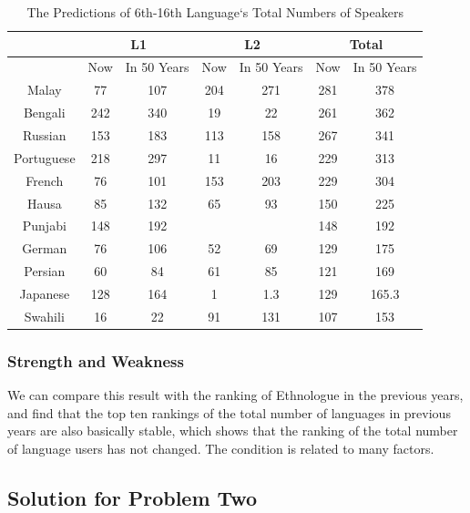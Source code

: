 \begin{table}[H]
\centering
\caption{The Predictions of 6th-16th Language`s Total Numbers of Speakers}
\label{Bdaan}
\begin{tabular}{ccccccc}
        \toprule
           & \multicolumn{2}{c}{L1} & \multicolumn{2}{c}{L2} & \multicolumn{2}{c}{Total} \\
           \midrule
           & Now    & In 50 Years   & Now    & In 50 Years   & Now     & In 50 Years     \\
Malay      & 77     & 107           & 204    & 271           & 281     & 378             \\
Bengali    & 242    & 340           & 19     & 22            & 261     & 362             \\
Russian    & 153    & 183           & 113    & 158           & 267     & 341             \\
Portuguese & 218    & 297           & 11     & 16            & 229     & 313             \\
French     & 76     & 101           & 153    & 203           & 229     & 304             \\
Hausa      & 85     & 132           & 65     & 93            & 150     & 225             \\
Punjabi    & 148    & 192           &        &               & 148     & 192             \\
German     & 76     & 106           & 52     & 69            & 129     & 175             \\
Persian    & 60     & 84            & 61     & 85            & 121     & 169             \\
Japanese   & 128    & 164           & 1      & 1.3           & 129     & 165.3           \\
Swahili    & 16     & 22            & 91     & 131           & 107     & 153\\
\bottomrule
\end{tabular}
\end{table}
\subsubsection{Strength and Weakness}
We can compare this result with the ranking of Ethnologue in the previous years, and find that the top ten rankings of the total number of languages in previous years are also basically stable, which shows that the ranking of the total number of language users has not changed. The condition is related to many factors.
\subsection{Solution for Problem Two}

